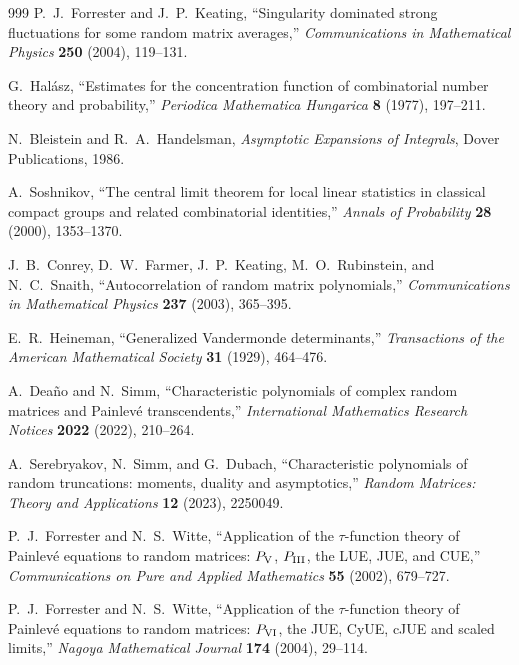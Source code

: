 \begin{thebibliography}{999}
P.~J.~Forrester and J.~P.~Keating,
``Singularity dominated strong fluctuations for some random matrix averages,''
\emph{Communications in Mathematical Physics} \textbf{250} (2004), 119--131.

G.~Hal\'asz,
``Estimates for the concentration function of combinatorial number theory and
probability,''
\emph{Periodica Mathematica Hungarica} \textbf{8} (1977), 197--211.

N.~Bleistein and R.~A.~Handelsman,
\emph{Asymptotic Expansions of Integrals},
Dover Publications, 1986.

A.~Soshnikov,
``The central limit theorem for local linear statistics in classical compact groups and
related combinatorial identities,''
\emph{Annals of Probability} \textbf{28} (2000), 1353--1370.

J.~B.~Conrey, D.~W.~Farmer, J.~P.~Keating, M.~O.~Rubinstein, and N.~C.~Snaith,
``Autocorrelation of random matrix polynomials,''
\emph{Communications in Mathematical Physics} \textbf{237} (2003), 365--395.

E.~R.~Heineman,
``Generalized Vandermonde determinants,''
\emph{Transactions of the American Mathematical Society} \textbf{31} (1929),
464--476.

A.~Dea\~no and N.~Simm,
``Characteristic polynomials of complex random matrices and Painlev\'e transcendents,''
\emph{International Mathematics Research Notices} \textbf{2022} (2022), 210--264.

A.~Serebryakov, N.~Simm, and G.~Dubach,
``Characteristic polynomials of random truncations: moments, duality and asymptotics,''
\emph{Random Matrices: Theory and Applications} \textbf{12} (2023), 2250049.

P.~J.~Forrester and N.~S.~Witte,
``Application of the $\tau$-function theory of Painlev\'e equations to random matrices:
$P_{\rm V}$, $P_{\rm III}$, the LUE, JUE, and CUE,''
\emph{Communications on Pure and Applied Mathematics} \textbf{55} (2002), 679--727.

P.~J.~Forrester and N.~S.~Witte,
``Application of the $\tau$-function theory of Painlev\'e equations to random matrices:
$P_{\rm VI}$, the JUE, CyUE, cJUE and scaled limits,''
\emph{Nagoya Mathematical Journal} \textbf{174} (2004), 29--114.


\end{thebibliography}
